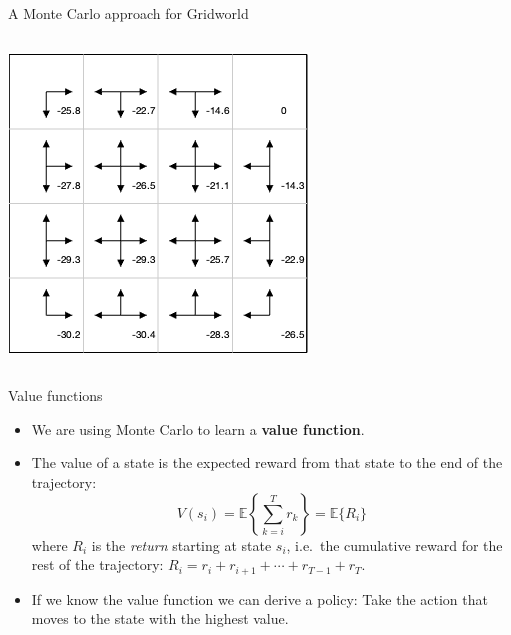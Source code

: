 \documentclass[9pt]{beamer}
\newcommand\lspace{\addtolength{\itemsep}{0.5\baselineskip}}
\begin{document}
\begin{frame}{A Monte Carlo approach for Gridworld}
\begin{columns}
\begin{column}{0.5\textwidth}
	\begin{center}
		\includegraphics[width=\textwidth]{figures/gridworld1a.png}	
	\end{center}
\end{column}

\end{columns}

\end{frame}

\begin{frame}{Value functions}

\begin{itemize}\lspace
	\item We are using Monte Carlo to learn a \textbf{value function}.
	\item The value of a state is the expected reward from that state to the end of the trajectory:
		\[ V(s_i) = \mathbb{E}\left\{ \sum_{k=i}^T r_k \right\} = \mathbb{E}\{R_i\} \]
	where $R_i$ is the \emph{return} starting at state $s_i$, i.e.\ the cumulative reward for the rest of the trajectory: $R_i = r_i + r_{i+1} + \cdots + r_{T-1} + r_T$.
	\item<2-> If we know the value function we can derive a policy: Take the action that moves to the state with the highest value.
\end{itemize}
	
\end{frame}
\end{document}
